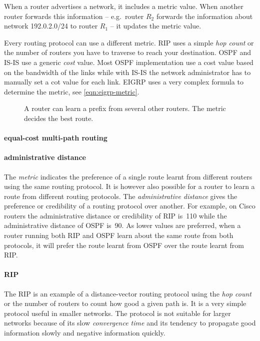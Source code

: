 When a router advertises a network, it includes a metric value.
When another router forwards this information -- e.g.~router $R_2$ forwards the information about network 192.0.2.0/24 to router $R_1$ -- it updates the metric value.

Every routing protocol can use a different metric.
\acs{RIP} uses a simple \emph{hop count} or the number of routers you have to traverse to reach your destination.
\acs{OSPF} and \acs{IS-IS} use a generic \emph{cost} value.
Most \acs{OSPF} implementation use a cost value based on the bandwidth of the links while with \acs{IS-IS} the network administrator has to manually set a cot value for each link.
\acs{EIGRP} uses a very complex formula to determine the metric, see \vref{eqn:eigrp-metric}.

\begin{figure}
   \centering
   
   \caption[The metric decides the best route in a network]{A router can learn a prefix from several other routers. The metric decides the best route.}
   \label{fig:metric}
\end{figure}

\paragraph{equal-cost multi-path routing}

\paragraph{administrative distance}
The \emph{metric} indicates the preference of a single route learnt from different routers using the same routing protocol.
It is however also possible for a router to learn a route from different routing protocols.
The \emph{administrative distance} gives the preference or credibility of a routing protocol over another.
For example, on Cisco routers the administrative distance or credibility of \acs{RIP} is~110 while the administrative distance of \acs{OSPF} is~90.
As lower values are preferred, when a router running both \acs{RIP} and \acs{OSPF} learn about the same route from both protocols, it will prefer the route learnt from \acs{OSPF} over the route learnt from \acs{RIP}.

\paragraph{\acf{RIP}}
The \acl{RIP} is an example of a distance-vector routing protocol using the \emph{hop count} or the number of routers to count how good a given path is.%
It is a very simple protocol useful in smaller networks.
The protocol is not suitable for larger networks because of its slow \emph{convergence time} and its tendency to propagate good information slowly and negative information quickly.

